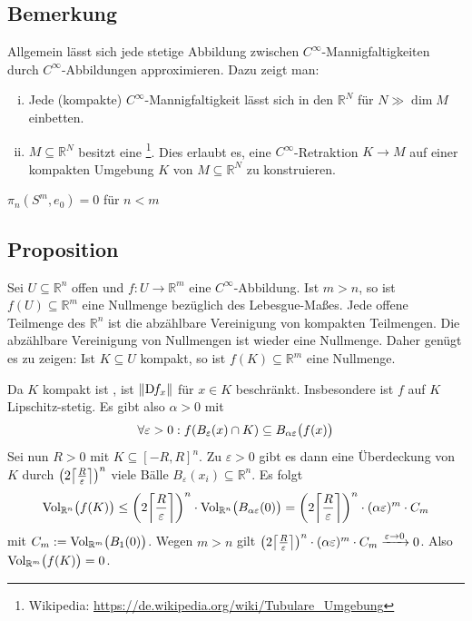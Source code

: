 \subsection[Bemerkung: Jede stetige Abbildung zwischen $C^\infty$-Mfkt. ist approximierbar]{Bemerkung} %
\label{sub:174}
Allgemein lässt sich jede stetige Abbildung zwischen $C^\infty$-Mannigfaltigkeiten durch $C^\infty$-Abbildungen approximieren. Dazu zeigt man:
\begin{enumerate}[(i)]
	\item Jede (kompakte) $C^\infty$-Mannigfaltigkeit lässt sich in den $\mathds{R}^N$ für $N \gg \dim M$ einbetten.
	\item $M \subseteq \mathds{R}^N$ besitzt eine \footnote{Wikipedia: \url{https://de.wikipedia.org/wiki/Tubulare_Umgebung}}. 
	Dies erlaubt es, eine $C^\infty$-Retraktion $K \to M$ auf einer kompakten Umgebung $K$ von $M \subseteq \mathds{R}^N$ zu konstruieren.
\end{enumerate}
\begin{center}
	$\pi_n(S^m, e_0) = 0$ für $n <m$ 
\end{center}

\subsection[Proposition: Für $f : U \subseteq \mathds{R}^n \to \mathds{R}^m$, $m > n$ ist $f(U)$ eine Nullmenge]{Proposition} %
\label{sub:175}
Sei $U \subseteq \mathds{R}^n$ offen und $f : U \to \mathds{R}^m$ eine $C^\infty$-Abbildung. Ist $m > n$, so ist $f(U) \subseteq \mathds{R}^m$ eine Nullmenge bezüglich
des Lebesgue-Maßes.
Jede offene Teilmenge des $\mathds{R}^n$ ist die abzählbare Vereinigung von kompakten Teilmengen. Die abzählbare Vereinigung von Nullmengen ist wieder eine Nullmenge. Daher
genügt es zu zeigen: Ist $K \subseteq U$ kompakt, so ist $f(K) \subseteq \mathds{R}^m$ eine Nullmenge. 

Da $K$ kompakt ist , ist $\norm{\D f_x} $ für $x \in K$ beschränkt. Insbesondere ist $f$ auf $K$ Lipschitz-stetig. Es gibt also $\alpha >0$ mit 
\[
	\forall \varepsilon > 0 : f \enbrace*{B_\varepsilon(x) \cap K} \subseteq B_{\alpha \varepsilon} \enbrace[\big]{f(x)}  
\]
Sei nun $R >0$ mit $K \subseteq [-R,R]^n$. Zu $\varepsilon>0$ gibt es dann eine Überdeckung von $K$ durch $\enbrace*{2 \ceil*{\frac{R}{\varepsilon}} }^n$ viele Bälle 
$B_\varepsilon(x_i) \subseteq \mathds{R}^n$. Es folgt 
\[
	\Vol_{\mathds{R}^n}\enbrace[\big]{f(K)} \le \enbrace*{2  \ceil*{\frac{R}{\varepsilon}}  }^n \cdot \Vol_{\mathds{R}^n} \enbrace[\big]{B_{\alpha \varepsilon}(0)} =   
	\enbrace*{2 \ceil*{\frac{R}{\varepsilon}}  }^n \cdot (\alpha \varepsilon)^m \cdot C_m
\]
mit $C_m := \Vol_{\mathds{R}^m} \enbrace[\big]{B_1(0)}$. Wegen $m >n$ gilt 
$\enbrace*{2 \ceil*{\frac{R}{\varepsilon}}  }^n \cdot (\alpha \varepsilon)^m \cdot C_m \xrightarrow{\varepsilon \to 0} 0 $.  Also 
$\Vol_{\mathds{R}^m} \enbrace[\big]{f(K)}=0$. \bewende

